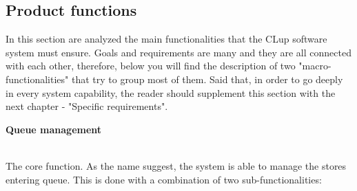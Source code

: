 \documentclass[]{article}
\begin{document}
		
		

\newpage

\subsection{Product functions}

In this section are analyzed the main functionalities that the CLup software system must ensure. Goals and requirements are many and they are all connected with each other, therefore, below you will find the description of two "macro-functionalities" that try to group most of them. Said that, in order to go deeply in every system capability, the reader should supplement this section with the next chapter - "Specific requirements".
\bigskip
\\
\begin{large}
	\textbf{Queue management}
\end{large}
\smallskip
\\
The core function. As the name suggest, the system is able to manage the stores entering queue. This is done with a combination of two sub-functionalities: 
\end{document}

